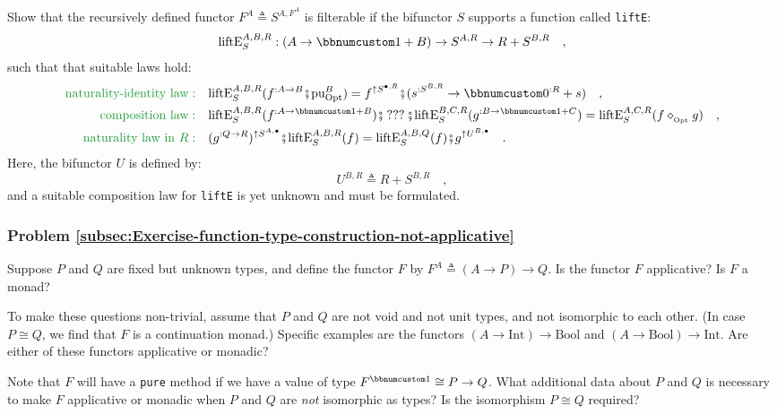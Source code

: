 Show that the recursively defined functor $F^{A}\triangleq S^{A,F^{A}}$
is filterable if the bifunctor $S$ supports a function called \lstinline!liftE!:
\[
\text{liftE}_{S}^{A,B,R}:(A\rightarrow\bbnum 1+B)\rightarrow S^{A,R}\rightarrow R+S^{B,R}\quad,
\]
such that that suitable laws hold:
\begin{align*}
{\color{greenunder}\text{naturality-identity law}:}\quad & \text{liftE}_{S}^{A,B,R}(f^{:A\rightarrow B}\bef\text{pu}_{\text{Opt}}^{B})=f^{\uparrow S^{\bullet,R}}\bef(s^{:S^{B,R}}\rightarrow\bbnum 0^{:R}+s)\quad,\\
{\color{greenunder}\text{composition law}:}\quad & \text{liftE}_{S}^{A,B,R}(f^{:A\rightarrow\bbnum 1+B})\bef\,???\,\bef\text{liftE}_{S}^{B,C,R}(g^{:B\rightarrow\bbnum 1+C})=\text{liftE}_{S}^{A,C,R}(f\diamond_{_{\text{Opt}}}g)\quad,\\
{\color{greenunder}\text{naturality law in }R:}\quad & (g^{:Q\rightarrow R})^{\uparrow S^{A,\bullet}}\bef\text{liftE}_{S}^{A,B,R}(f)=\text{liftE}_{S}^{A,B,Q}(f)\bef g^{\uparrow U^{B,\bullet}}\quad.
\end{align*}
Here, the bifunctor $U$ is defined by:
\[
U^{B,R}\triangleq R+S^{B,R}\quad,
\]
and a suitable composition law for \lstinline!liftE! is yet unknown
and must be formulated.

\subsubsection{Problem \label{subsec:Exercise-function-type-construction-not-applicative}\ref{subsec:Exercise-function-type-construction-not-applicative}}

Suppose $P$ and $Q$ are fixed but unknown types, and define the
functor $F$ by $F^{A}\triangleq(A\rightarrow P)\rightarrow Q$. Is
the functor $F$ applicative? Is $F$ a monad?

To make these questions non-trivial, assume that $P$ and $Q$ are
not void and not unit types, and not isomorphic to each other. (In
case $P\cong Q$, we find that $F$ is a continuation monad.) Specific
examples are the functors $(A\rightarrow\text{Int})\rightarrow\text{Bool}$
and $(A\rightarrow\text{Bool})\rightarrow\text{Int}$. Are either
of these functors applicative or monadic?

Note that $F$ will have a \lstinline!pure! method if we have a value
of type $F^{\bbnum 1}\cong P\rightarrow Q$. What additional data
about $P$ and $Q$ is necessary to make $F$ applicative or monadic
when $P$ and $Q$ are \emph{not} isomorphic as types? Is the isomorphism
$P\cong Q$ required?

